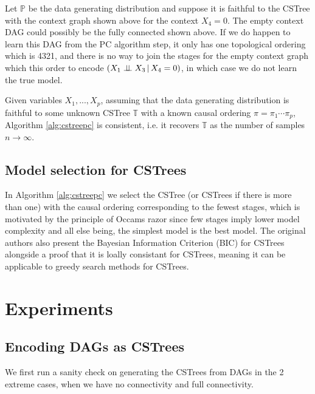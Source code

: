 \documentclass{tufte-book}
\begin{document}
Let \(\mathbb{P}\) be the data generating distribution and suppose it is faithful to the CSTree with the context graph shown above for the context \(X_4=0\). The empty context DAG could possibly be the fully connected shown above. If we do happen to learn this DAG from the PC algorithm step, it only has one topological ordering which is 4321, and there is no way to join the stages for the empty context graph which this order to encode \((X_1 \perp \!\!\! \perp X_3 \,|\,X_4=0)\), in which case we do not learn the true model.


\begin{theorem}\label{thm:cstreepccorrectness}
Given variables $X_1,...,X_p$, assuming that the data generating distribution is faithful to some unknown CSTree $\mathbb{T}$ with a known causal ordering $\pi = \pi_1 \cdots \pi_p$, Algorithm \ref{alg:cstreepc} is consistent, i.e. it recovers $\mathbb{T}$ as the number of samples $n \rightarrow \infty$.
\end{theorem}


\section{Model selection for CSTrees}
\label{sec:org5112ce0}
In Algorithm \ref{alg:cstreepc} we select the CSTree (or CSTrees if there is more than one) with the causal ordering corresponding to the fewest stages, which is motivated by the principle of Occams razor since few stages imply lower model complexity and all else being, the simplest model is the best model. The original authors also present the Bayesian Information Criterion (BIC) for CSTrees alongside a proof that it is loally consistant for CSTrees, meaning it can be applicable to greedy search methods for CSTrees.



\chapter{Experiments}
\label{sec:org9a3b698}
\section{Encoding DAGs as CSTrees}
\label{sec:orge5c3d21}
We first run a sanity check on generating the CSTrees from DAGs in the 2 extreme cases, when we have no connectivity and full connectivity.
\end{document}
